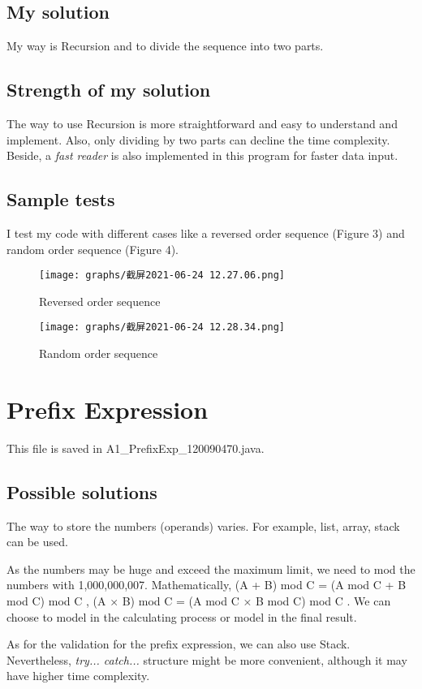 \documentclass{article}
\begin{document}
    \subsection{My solution}
    My way is Recursion and to divide the sequence into two parts. 

    \subsection{Strength of my solution}
    The way to use Recursion is more straightforward and easy to understand and implement. Also, only dividing by two parts can decline the time complexity. Beside, a \textit{fast reader} is also implemented in this program for faster data input. 

    \subsection{Sample tests}
    I test my code with different cases like a reversed order sequence (Figure 3) and random order sequence (Figure 4).

    \begin{figure}[h]
        \begin{minipage}{0.5\linewidth}
          \centering
          \texttt{[image: graphs/截屏2021-06-24 12.27.06.png]}
          \caption{Reversed order sequence}
        \end{minipage}
        \begin{minipage}{0.5\linewidth}
          \centering
          \texttt{[image: graphs/截屏2021-06-24 12.28.34.png]}
          \caption{Random order sequence}
        \end{minipage}
    \end{figure}


\section{Prefix Expression}
This file is saved in A1\_PrefixExp\_120090470.java. 

    \subsection{Possible solutions}
    The way to store the numbers (operands) varies. For example, list, array, stack can be used. \par
    As the numbers may be huge and exceed the maximum limit, we need to mod the numbers with 1,000,000,007. Mathematically, (A + B) mod C = (A mod C + B mod C) mod C , (A × B) mod C = (A mod C × B mod C) mod C . We can choose to model in the calculating process or model in the final result.\par
    As for the validation for the prefix expression, we can also use Stack. Nevertheless, \textit{try... catch...} structure might be more convenient, although it may have higher time complexity.
\end{document}
